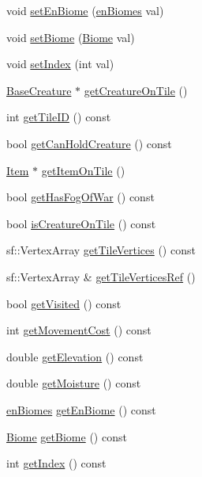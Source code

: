 \begin{DoxyCompactItemize}
\item 
void \mbox{\hyperlink{class_tile_ae03b5d774807e88f80d11ad3853f2c4f}{set\+En\+Biome}} (\mbox{\hyperlink{_enum_types_8hpp_a5c2255009cd01c90cf68245e6f453d1c}{en\+Biomes}} val)
\item 
void \mbox{\hyperlink{class_tile_abc32adecb440f996c755cfc7e29fb3b0}{set\+Biome}} (\mbox{\hyperlink{class_biome}{Biome}} val)
\item 
void \mbox{\hyperlink{class_tile_a49ca97352b3886f7e670c855bde21deb}{set\+Index}} (int val)
\item 
\mbox{\hyperlink{class_base_creature}{Base\+Creature}} $\ast$ \mbox{\hyperlink{class_tile_a54ef2c2caca417c3352c721371c0e54f}{get\+Creature\+On\+Tile}} ()
\item 
int \mbox{\hyperlink{class_tile_ae88240c2fc1f77f6dae91c2b905f70c5}{get\+Tile\+ID}} () const
\item 
bool \mbox{\hyperlink{class_tile_a5e1ec597a89119d8c3fc0c77cce38ef9}{get\+Can\+Hold\+Creature}} () const
\item 
\mbox{\hyperlink{class_item}{Item}} $\ast$ \mbox{\hyperlink{class_tile_a21a4a6291fcf5bfd4e05ddc9eeda61b0}{get\+Item\+On\+Tile}} ()
\item 
bool \mbox{\hyperlink{class_tile_a97e47a049bb0a5db19d3641b285cf52d}{get\+Has\+Fog\+Of\+War}} () const
\item 
bool \mbox{\hyperlink{class_tile_a450d291bd9711aa77373d56c37cea05a}{is\+Creature\+On\+Tile}} () const
\item 
sf\+::\+Vertex\+Array \mbox{\hyperlink{class_tile_ab3414f28d4e7334903bc9e8f8451ccee}{get\+Tile\+Vertices}} () const
\item 
sf\+::\+Vertex\+Array \& \mbox{\hyperlink{class_tile_a809331f7f2702ca0e0473446b7e37b06}{get\+Tile\+Vertices\+Ref}} ()
\item 
bool \mbox{\hyperlink{class_tile_aa062f5d016739f13f9239341acb75e73}{get\+Visited}} () const
\item 
int \mbox{\hyperlink{class_tile_ad74eb4bf920e8dab5af3d410643e8e8d}{get\+Movement\+Cost}} () const
\item 
double \mbox{\hyperlink{class_tile_ae55f1f904e96c3acc966d007f52b5b4f}{get\+Elevation}} () const
\item 
double \mbox{\hyperlink{class_tile_a2f14f1d8b4bed8fd4ebd21032e743ed9}{get\+Moisture}} () const
\item 
\mbox{\hyperlink{_enum_types_8hpp_a5c2255009cd01c90cf68245e6f453d1c}{en\+Biomes}} \mbox{\hyperlink{class_tile_ad222bb34de7a88d904df0e92709d9b75}{get\+En\+Biome}} () const
\item 
\mbox{\hyperlink{class_biome}{Biome}} \mbox{\hyperlink{class_tile_a6750de19b8f92165d781374b5a327bb5}{get\+Biome}} () const
\item 
int \mbox{\hyperlink{class_tile_a7a941c37770d150b5d416f5cccd7085a}{get\+Index}} () const
\end{DoxyCompactItemize}

